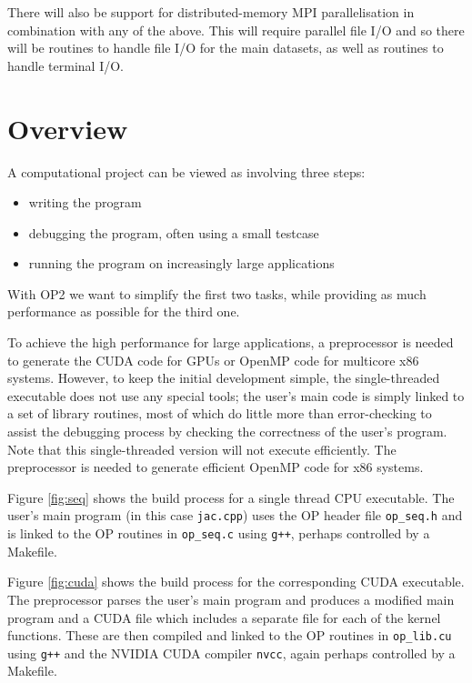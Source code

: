 \documentclass[11pt]{article}
\begin{document}
There will also be support for distributed-memory MPI 
parallelisation in combination with any of the above.  This will 
require parallel file I/O and so there will be routines to handle 
file I/O for the main datasets, as well as routines to handle 
terminal I/O.

\newpage
\section{Overview}

A computational project can be viewed as involving three steps:
\begin{itemize}
\item
writing the program
\item
debugging the program, often using a small testcase
\item
running the program on increasingly large applications
\end{itemize}

With OP2 we want to simplify the first two tasks, while 
providing as much performance as possible for the third one.  

To achieve the high performance for large applications, a 
preprocessor is needed to generate the CUDA code for GPUs 
or OpenMP code for multicore x86 systems.  However, to keep 
the initial development simple, the single-threaded executable 
does not use any special tools; the user's main code is simply 
linked to a set of library routines, most of which do little 
more than error-checking to assist the debugging process by 
checking the correctness of the user's program.  Note that this 
single-threaded version will not execute efficiently.  The
preprocessor is needed to generate efficient OpenMP code for 
x86 systems.

Figure \ref{fig:seq} shows the build process for a single 
thread CPU executable.  The user's main program (in this case 
{\tt jac.cpp}) uses the OP header file {\tt op\_seq.h} and is 
linked to the OP routines in {\tt op\_seq.c} using {\tt g++},
perhaps controlled by a Makefile.

Figure \ref{fig:cuda} shows the build process for the corresponding
CUDA executable.  The preprocessor parses the user's main program 
and produces a modified main program and a CUDA file which
includes a separate file for each of the kernel functions.  These 
are then compiled and linked to the OP routines in {\tt op\_lib.cu} 
using {\tt g++} and the NVIDIA CUDA compiler {\tt nvcc}, again 
perhaps controlled by a Makefile.
\end{document}
